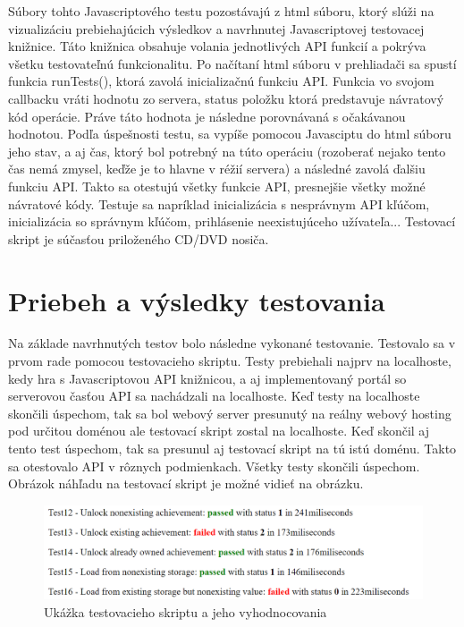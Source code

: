 Súbory tohto Javascriptového testu pozostávajú z html súboru, ktorý slúži na vizualizáciu prebiehajúcich výsledkov a navrhnutej Javascriptovej testovacej knižnice. Táto knižnica obsahuje volania jednotlivých API funkcií a pokrýva všetku testovateľnú funkcionalitu. Po načítaní html súboru v prehliadači sa spustí funkcia runTests(), ktorá zavolá inicializačnú funkciu API. Funkcia vo svojom callbacku vráti hodnotu zo servera, status položku ktorá predstavuje návratový kód operácie. Práve táto hodnota je následne porovnávaná s očakávanou hodnotou. Podľa úspešnosti testu, sa vypíše pomocou Javasciptu do html súboru jeho stav, a aj čas, ktorý bol potrebný na túto operáciu (rozoberať nejako tento čas nemá zmysel, keďže je to hlavne v réžií servera) a následné zavolá ďalšiu funkciu API. Takto sa otestujú všetky funkcie API, presnejšie všetky možné návratové kódy. Testuje sa napríklad inicializácia s nesprávnym API kľúčom, inicializácia so správnym kľúčom, prihlásenie neexistujúceho užívateľa... Testovací skript je súčasťou priloženého CD/DVD nosiča.

\section{Priebeh a výsledky testovania}
Na základe navrhnutých testov bolo následne vykonané testovanie. Testovalo sa v prvom rade pomocou testovacieho skriptu. Testy prebiehali najprv na localhoste, kedy hra s Javascriptovou API knižnicou, a aj implementovaný portál so serverovou časťou API sa nachádzali na localhoste. Keď testy na localhoste skončili úspechom, tak sa bol webový server presunutý na reálny webový hosting pod určitou doménou ale testovací skript zostal na localhoste. Keď skončil aj tento test úspechom, tak sa presunul aj testovací skript na tú istú doménu. Takto sa otestovalo API v rôznych podmienkach. Všetky testy skončili úspechom. Obrázok náhľadu na testovací skript je možné vidieť na obrázku. 
\begin{figure}[h]
  \centering
  \includegraphics[scale=0.45]{fig/tests.png}
  \caption{Ukážka testovacieho skriptu a jeho vyhodnocovania}
  \label{fig:test}
\end{figure}

